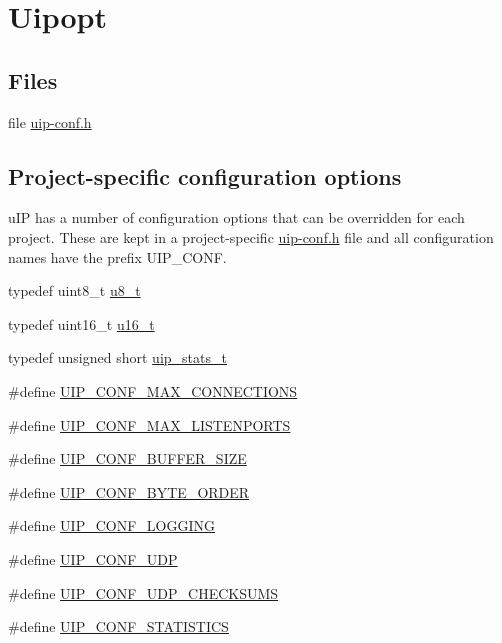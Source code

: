 \hypertarget{group__uipopt}{\section{Uipopt}
\label{group__uipopt}
}
\subsection*{Files}
\begin{DoxyCompactItemize}
\item 
file \hyperlink{uip-conf_8h}{uip-\/conf.\+h}
\end{DoxyCompactItemize}
\subsection*{Project-\/specific configuration options}
\label{_amgrpa633c8dacb583c46c2a4af56ab61e8ca}%
u\+I\+P has a number of configuration options that can be overridden for each project. These are kept in a project-\/specific \hyperlink{uip-conf_8h}{uip-\/conf.\+h} file and all configuration names have the prefix U\+I\+P\+\_\+\+C\+O\+N\+F. \begin{DoxyCompactItemize}
\item 
typedef uint8\+\_\+t \hyperlink{group__uipopt_ga4caecabca98b43919dd11be1c0d4cd8e}{u8\+\_\+t}
\item 
typedef uint16\+\_\+t \hyperlink{group__uipopt_ga77570ac4fcab86864fa1916e55676da2}{u16\+\_\+t}
\item 
typedef unsigned short \hyperlink{group__uipopt_ga727459e5c4f777543c81ffffa3df3f0c}{uip\+\_\+stats\+\_\+t}
\item 
\#define \hyperlink{group__uipopt_ga3f6f1f6f98431f2d33ed30a30d2ccc35}{U\+I\+P\+\_\+\+C\+O\+N\+F\+\_\+\+M\+A\+X\+\_\+\+C\+O\+N\+N\+E\+C\+T\+I\+O\+N\+S}
\item 
\#define \hyperlink{group__uipopt_ga974c9b4bbe6b07cc1d64ac4fad278030}{U\+I\+P\+\_\+\+C\+O\+N\+F\+\_\+\+M\+A\+X\+\_\+\+L\+I\+S\+T\+E\+N\+P\+O\+R\+T\+S}
\item 
\#define \hyperlink{group__uipopt_gacacc406c3bf7d0e00412e4c946252739}{U\+I\+P\+\_\+\+C\+O\+N\+F\+\_\+\+B\+U\+F\+F\+E\+R\+\_\+\+S\+I\+Z\+E}
\item 
\#define \hyperlink{group__uipopt_gaca1240bba5dd57f8c7c27123c84a1f6d}{U\+I\+P\+\_\+\+C\+O\+N\+F\+\_\+\+B\+Y\+T\+E\+\_\+\+O\+R\+D\+E\+R}
\item 
\#define \hyperlink{group__uipopt_ga3001114ddadc1f2ada5cc9a780e866fc}{U\+I\+P\+\_\+\+C\+O\+N\+F\+\_\+\+L\+O\+G\+G\+I\+N\+G}
\item 
\#define \hyperlink{group__uipopt_ga763f12007aad8cc0e483bf50f8a8d9b4}{U\+I\+P\+\_\+\+C\+O\+N\+F\+\_\+\+U\+D\+P}
\item 
\#define \hyperlink{group__uipopt_ga9dd44616d41cef74d3beb51d8be5ecec}{U\+I\+P\+\_\+\+C\+O\+N\+F\+\_\+\+U\+D\+P\+\_\+\+C\+H\+E\+C\+K\+S\+U\+M\+S}
\item 
\#define \hyperlink{group__uipopt_ga529648ad3b0b327a43689b0f1779ff55}{U\+I\+P\+\_\+\+C\+O\+N\+F\+\_\+\+S\+T\+A\+T\+I\+S\+T\+I\+C\+S}
\end{DoxyCompactItemize}


